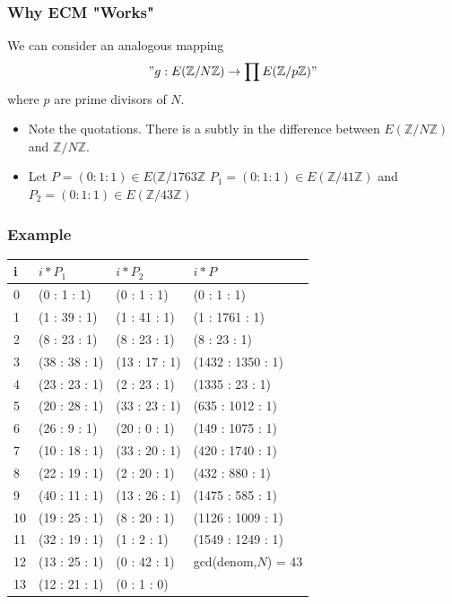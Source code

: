 \documentclass{beamer}
\begin{document}
\begin{frame}
\frametitle{Why ECM "Works"}
We can consider an analogous mapping
$$
	"g: E(\mathbb{Z}/N\mathbb{Z}) \rightarrow \prod E(\mathbb{Z}/p\mathbb{Z})"
$$
where $p$ are prime divisors of $N$.

\begin{itemize}
\item Note the quotations. There is a subtly in the difference between $E(\mathbb{Z}/N\mathbb{Z})$ and $\mathbb{Z}/N\mathbb{Z}$.
\item  Let $P = (0:1:1) \in E(\mathbb{Z}/1763\mathbb{Z}$ $P_1 = (0:1:1) \in E(\mathbb{Z}/41\mathbb{Z})$ and $P_2 = (0:1:1) \in E(\mathbb{Z}/43\mathbb{Z})$
\end{itemize}
\end{frame}

\begin{frame}
\frametitle{Example}
\begin{tabular}{l|l|l|l}
i & $i*P_1$ & $i*P_2$ & $i*P$ \\
\hline
0 & (0 : 1 : 1) & (0 : 1 : 1) & (0 : 1 : 1)\\
1 & (1 : 39 : 1)& (1 : 41 : 1) & (1 : 1761 : 1) \\
2 & (8 : 23 : 1)& (8 : 23 : 1) & (8 : 23 : 1) \\
3 &(38 : 38 : 1)& (13 : 17 : 1) & (1432 : 1350 : 1) \\
4 &(23 : 23 : 1) & (2 : 23 : 1) & (1335 : 23 : 1) \\
5 &(20 : 28 : 1) & (33 : 23 : 1) & (635 : 1012 : 1) \\
6 &(26 : 9 : 1) & (20 : 0 : 1) & (149 : 1075 : 1) \\
7& (10 : 18 : 1) &(33 : 20 : 1) & (420 : 1740 : 1) \\
8& (22 : 19 : 1) &(2 : 20 : 1) & (432 : 880 : 1)\\
9 &(40 : 11 : 1) &(13 : 26 : 1) & (1475 : 585 : 1)\\
10 &(19 : 25 : 1) &(8 : 20 : 1) & (1126 : 1009 : 1)\\
11& (32 : 19 : 1)& (1 : 2 : 1) & (1549 : 1249 : 1) \\
12& (13 : 25 : 1)& (0 : 42 : 1) & gcd(denom,$N$) = 43 \\
13 &(12 : 21 : 1) &(0 : 1 : 0) &
\end{tabular}
\end{frame}
\end{document}
